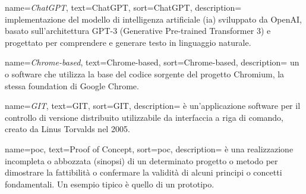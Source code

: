 

 {
    name=\textit{ChatGPT},
    text=ChatGPT,
    sort=ChatGPT,
    description={ implementazione del modello di intelligenza artificiale (\acrshort{ia}) sviluppato da OpenAI, basato sull'architettura GPT-3 (Generative Pre-trained Transformer 3) e progettato per comprendere e generare testo in linguaggio naturale. \\
    \cite{site:chatgpt-treccani}
    }
}

 {
    name=\textit{Chrome-based},
    text=Chrome-based,
    sort=Chrome-based,
    description={ un  o software che utilizza la base del codice sorgente del progetto  Chromium, la stessa foundation di Google Chrome.
    }
}

 {
    name=\textit{GIT},
    text=GIT,
    sort=GIT,
    description={ è un'applicazione software per il controllo di versione distribuito utilizzabile da interfaccia a riga di comando, creato da Linus Torvalds nel 2005. \\
    \cite{site:git-wiki}
    }
}

 {
    name=\acrshort{poc},
    text=Proof of Concept,
    sort=poc,
    description={ è una realizzazione incompleta o abbozzata (sinopsi) di un determinato progetto o metodo per dimostrare la fattibilità o confermare la validità di alcuni principi o concetti fondamentali. Un esempio tipico è quello di un prototipo. \\
    \cite{site:poc-wiki}
    }
}

